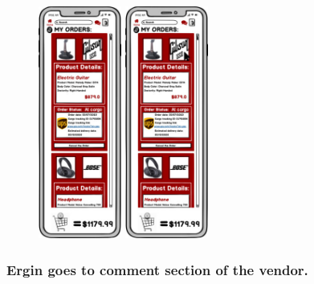 \documentclass[]{article}
\begin{document}
\begin{figure}[H]
    \centering
    \includegraphics[height=3in]{./images/15.jpg}
    \includegraphics[height=3in]{./images/16.jpg}
\end{figure}

\hypertarget{ergin-goes-to-comment-section-of-the-vendor.}{%
    \subsubsection{Ergin goes to comment section of the
        vendor.}\label{ergin-goes-to-comment-section-of-the-vendor.}}
\end{document}
